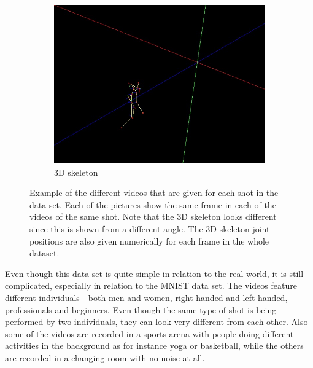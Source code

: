 \begin{figure}
\begin{subfigure}{.32\linewidth}
        \includegraphics[width=\linewidth]{Pics/04_Data/frame53_skelet3D.jpg}
        \caption{3D skeleton}
    \end{subfigure}
    \caption{Example of the different videos that are given for each shot in the data set. Each of the pictures show the same frame in each of the videos of the same shot. Note that the 3D skeleton looks different since this is shown from a different angle. The 3D skeleton joint positions are also given numerically for each frame in the whole dataset.}
    \label{fig:exampleVideosTennis}
\end{figure}

Even though this data set is quite simple in relation to the real world, it is still complicated, especially in relation to the MNIST data set. The videos feature different individuals - both men and women, right handed and left handed, professionals and beginners. Even though the same type of shot is being performed by two individuals, they can look very different from each other. Also some of the videos are recorded in a sports arena with people doing different activities in the background as for instance yoga or basketball, while the others are recorded in a changing room with no noise at all.

